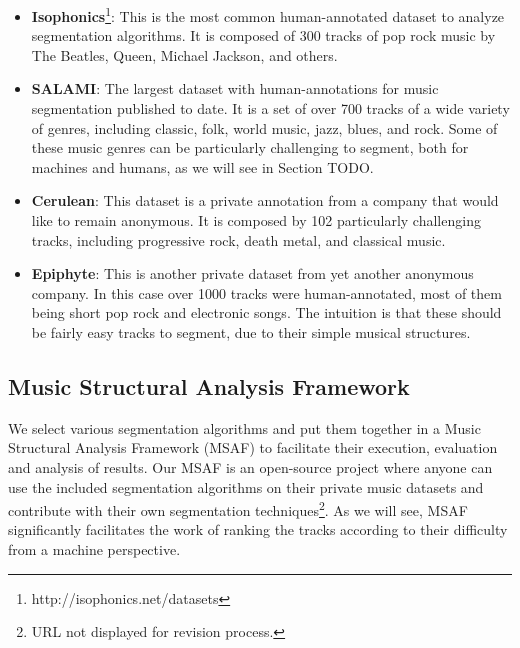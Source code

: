 \documentclass{article}
\begin{document}
\begin{itemize}
  \item
    \textbf{Isophonics}\footnote{http://isophonics.net/datasets}: This is the most common human-annotated dataset to analyze segmentation algorithms. 
    It is composed of 300 tracks of pop rock music by The Beatles, Queen, Michael Jackson, and others.

  \item
    \textbf{SALAMI}\cite{Smith2011}: The largest dataset with human-annotations for music segmentation published to date. 
    It is a set of over 700 tracks of a wide variety of genres, including classic, folk, world music, jazz, blues, and rock.
    Some of these music genres can be particularly challenging to segment, both for machines and humans, as we will see in Section TODO. %

  \item
    \textbf{Cerulean}: This dataset is a private annotation from a company that would like to remain anonymous.
    It is composed by 102 particularly challenging tracks, including progressive rock, death metal, and classical music.

  \item
    \textbf{Epiphyte}: This is another private dataset from yet another anonymous company.
    In this case over 1000 tracks were human-annotated, most of them being short pop rock and electronic songs.
    The intuition is that these should be fairly easy tracks to segment, due to their simple musical structures.

\end{itemize}

\subsection{Music Structural Analysis Framework}

We select various segmentation algorithms and put them together in a Music Structural Analysis Framework (MSAF) to facilitate their execution, evaluation and analysis of results. 
Our MSAF is an open-source project where anyone can use the included segmentation algorithms on their private music datasets and contribute with their own segmentation techniques\footnote{URL not displayed for revision process.}.
As we will see, MSAF significantly facilitates the work of ranking the tracks according to their difficulty from a machine perspective.

\end{document}
